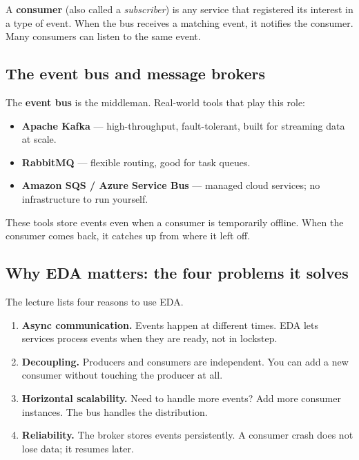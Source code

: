 \documentclass[a4paper,11pt]{article}
\newcommand{\vocab}[1]{\textbf{\color{navy}#1}}
\begin{document}
A \vocab{consumer} (also called a \emph{subscriber}) is any service that
registered its interest in a type of event. When the bus receives a matching
event, it notifies the consumer. Many consumers can listen to the same event.

\subsection{The event bus and message brokers}

The \vocab{event bus} is the middleman. Real-world tools that play this role:

\begin{itemize}
  \item \textbf{Apache Kafka} --- high-throughput, fault-tolerant, built for
        streaming data at scale.
  \item \textbf{RabbitMQ} --- flexible routing, good for task queues.
  \item \textbf{Amazon SQS / Azure Service Bus} --- managed cloud services;
        no infrastructure to run yourself.
\end{itemize}

These tools store events even when a consumer is temporarily offline.
When the consumer comes back, it catches up from where it left off.

\subsection{Why EDA matters: the four problems it solves}

The lecture lists four reasons to use EDA.

\begin{enumerate}
  \item \textbf{Async communication.} Events happen at different times.
        EDA lets services process events when they are ready, not in lockstep.
  \item \textbf{Decoupling.} Producers and consumers are independent.
        You can add a new consumer without touching the producer at all.
  \item \textbf{Horizontal scalability.} Need to handle more events?
        Add more consumer instances. The bus handles the distribution.
  \item \textbf{Reliability.} The broker stores events persistently.
        A consumer crash does not lose data; it resumes later.
\end{enumerate}
\end{document}
